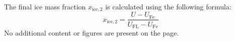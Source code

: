 The final ice mass fraction \( x_{\text{ice},2} \) is calculated using the following formula:  
\[
x_{\text{ice},2} = \frac{U - U_{\text{Fe}}}{U_{\text{FL}} - U_{\text{Fe}}}
\]  
No additional content or figures are present on the page.